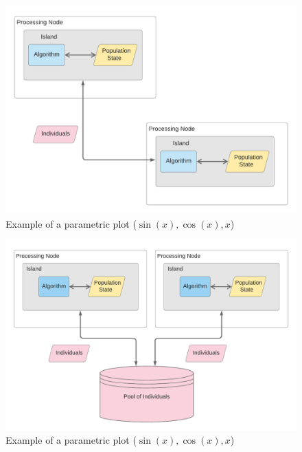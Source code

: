 \documentclass[review]{elsarticle}
\begin{document}
\begin{figure}[h]
    \centering
    \includegraphics[width=\textwidth]{classicisland}
    \caption{Example of a parametric plot ($\sin (x), \cos(x), x$)}
    \label{fig:kafkEO}
\end{figure}


\begin{figure}[h]
    \centering
    \includegraphics[width=\textwidth]{pool_island}
    \caption{Example of a parametric plot ($\sin (x), \cos(x), x$)}
    \label{fig:kafkEO}
\end{figure}
\end{document}
